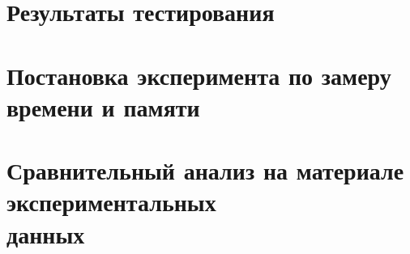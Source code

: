 \FloatBarrier

\section{Результаты тестирования}

\section{Постановка эксперимента по замеру времени и памяти}

\section{Сравнительный анализ на материале экспериментальных\\ данных}

